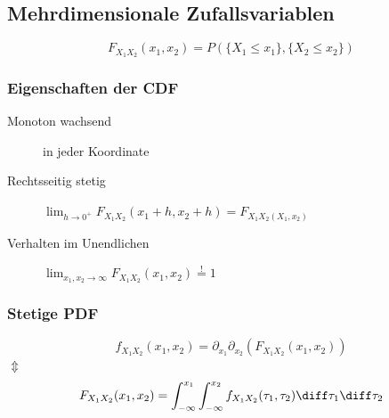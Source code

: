 \subsection{Mehrdimensionale Zufallsvariablen}
\begin{sectionbox}
    \begin{emphbox}
        \begin{equation*}
            F_{X_1X_2}(x_1, x_2) = P(\{X_1 \le x_1\}, \{X_2 \le x_2\})
        \end{equation*}
    \end{emphbox}

    \subsubsection{Eigenschaften der CDF}
    \begin{description}
        \item[Monoton wachsend] in jeder Koordinate
        \item[Rechtsseitig stetig] $\lim_{h\rightarrow 0^+}F_{X_1X_2}(x_1 + h, x_2 + h) = F_{X_1X_2(X_1, x_2)}$
        \item[Verhalten im Unendlichen] $\lim_{x_1,x_2\rightarrow\infty}F_{X_1X_2}(x_1,x_2)\overset{!}{=}1$
    \end{description}
\end{sectionbox}
\begin{sectionbox}
    \subsubsection{Stetige PDF}
    \begin{emphbox}
        \begin{equation*}
            f_{X_1X_2}(x_1,x_2)=\partial_{x_1}\partial_{x_2}\left(F_{X_1X_2}(x_1, x_2)\right)
        \end{equation*}
        $\Updownarrow$
        \begin{equation*}
            F_{X_1X_2}(x_1,x_2) = \int_{-\infty}^{x_1}\int_{-\infty}^{x_2}f_{X_1X_2}(\tau_1, \tau_2)\diff\tau_1\diff\tau_2
        \end{equation*}
    \end{emphbox}
\end{sectionbox}

